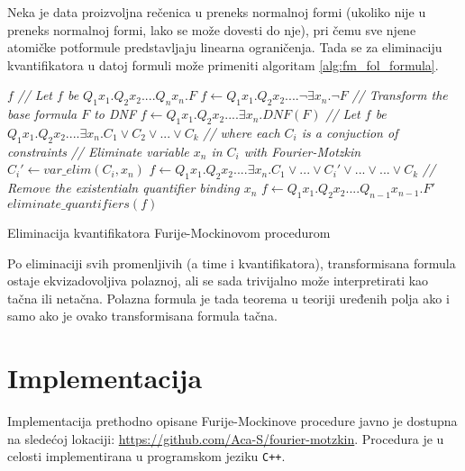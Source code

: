 \documentclass[a4paper,10pt]{article}
\begin{document}
Neka je data proizvoljna rečenica u preneks normalnoj formi (ukoliko nije u preneks normalnoj formi, lako se može dovesti do nje), pri čemu sve njene atomičke potformule predstavljaju linearna ograničenja. Tada se za eliminaciju kvantifikatora u datoj formuli može primeniti algoritam \ref{alg:fm_fol_formula}.

\begin{algorithm}[!ht]
    \begin{algorithmic}[1]
                \State \Return $f$
            \EndIf
            \State \textit{// Let $f$ be $Q_1x_1.Q_2x_2....Q_nx_n.F$}
                \State $f \gets Q_1x_1.Q_2x_2....\neg \exists x_n. \neg F$
            \EndIf
            \State \textit{// Transform the base formula $F$ to DNF}
            \State $f \gets Q_1x_1.Q_2x_2....\exists x_n.DNF(F)$
            \State \textit{// Let $f$ be $Q_1x_1.Q_2x_2....\exists x_n.C_1 \lor C_2 \lor ... \lor C_k$}
            \State \textit{// where each $C_i$ is a conjuction of constraints}
                \State \textit{// Eliminate variable $x_n$ in $C_i$ with Fourier-Motzkin}
                \State $C_i' \gets var\_elim(C_i, x_n)$
                \State $f \gets Q_1x_1.Q_2x_2....\exists x_n.C_1 \lor ... \lor C_i' \lor ... \lor ... \lor C_k$
            \EndFor
            \State \textit{// Remove the existentialn quantifier binding $x_n$}
            \State $f \gets Q_1x_1.Q_2x_2....Q_{n-1}x_{n-1}.F'$
            \State \Return $eliminate\_quantifiers(f)$
        \EndFunction
    \end{algorithmic}
    \caption{Eliminacija kvantifikatora Furije-Mockinovom procedurom}
    \label{alg:fm_fol_formula}
\end{algorithm}

Po eliminaciji svih promenljivih (a time i kvantifikatora), transformisana formula ostaje ekvizadovoljiva polaznoj, ali se sada trivijalno može interpretirati kao tačna ili netačna. Polazna formula je tada teorema u teoriji uređenih polja ako i samo ako je ovako transformisana formula tačna.

\section{Implementacija}
\label{sec:implementacija}

Implementacija prethodno opisane Furije-Mockinove procedure javno je dostupna na sledećoj lokaciji: \url{https://github.com/Aca-S/fourier-motzkin}. Procedura je u celosti implementirana u programskom jeziku \texttt{C++}.
\end{document}
